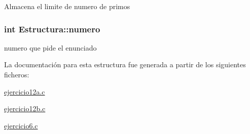 Almacena el limite de numero de primos \hypertarget{structEstructura_aac88eb7b472875436ed5fdf0b84aa1c3}{
\subsubsection[{numero}]{\setlength{\rightskip}{0pt plus 5cm}int Estructura\-::numero}}\label{structEstructura_aac88eb7b472875436ed5fdf0b84aa1c3}
numero que pide el enunciado 

La documentación para esta estructura fue generada a partir de los siguientes ficheros\-:\begin{DoxyCompactItemize}
\item 
\hyperlink{ejercicio12a_8c}{ejercicio12a.\-c}\item 
\hyperlink{ejercicio12b_8c}{ejercicio12b.\-c}\item 
\hyperlink{ejercicio6_8c}{ejercicio6.\-c}\end{DoxyCompactItemize}
